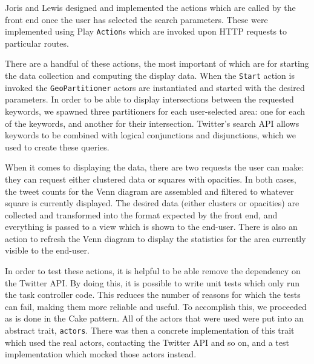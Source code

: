 Joris and Lewis designed and implemented the actions which are called by the
front end once the user has selected the search parameters.  These were
implemented using Play \verb+Action+s which are invoked upon HTTP requests to
particular routes.

There are a handful of these actions, the most important of which are for
starting the data collection and computing the display data.  When the
\verb+Start+ action is invoked the \verb+GeoPartitioner+ actors are
instantiated and started with the desired parameters.  In order to be able to
display intersections between the requested keywords, we spawned three
partitioners for each user-selected area: one for each of the keywords, and
another for their intersection.  Twitter's search API allows keywords to be
combined with logical conjunctions and disjunctions, which we used to create
these queries.

When it comes to displaying the data, there are two requests the user can make:
they can request either clustered data or squares with opacities.  In both
cases, the tweet counts for the Venn diagram are assembled and filtered to
whatever square is currently displayed.  The desired data (either clusters or
opacities) are collected and transformed into the format expected
by the front end, and everything is passed to a view which is shown to the
end-user.  There is also an action to refresh the Venn diagram to display the
statistics for the area currently visible to the end-user.

In order to test these actions, it is helpful to be able remove the dependency
on the Twitter API.  By doing this, it is possible to write unit tests which
only run the task controller code.  This reduces the number of reasons for which
the tests can fail, making them more reliable and useful.  To accomplish this,
we proceeded as is done in the Cake pattern.  All of the actors that were used
were put into an abstract trait, \verb+actors+.  There was then a concrete
implementation of this trait which used the real actors, contacting the Twitter
API and so on, and a test implementation which mocked those actors instead.
